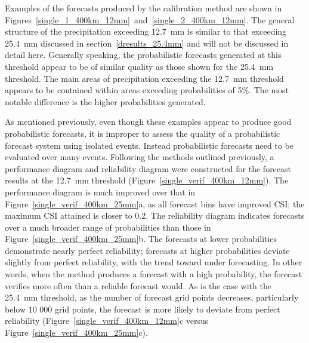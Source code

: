 Examples of the forecasts produced by the calibration method are shown in \mbox{Figures \ref{single_1_400km_12mm} and \ref{single_2_400km_12mm}}.
The general structure of the precipitation exceeding \mbox{12.7 mm} is similar to that exceeding \mbox{25.4 mm} discussed in \mbox{section \ref{dresults_25.4mm}} and will not be discussed in detail here.
Generally speaking, the probabilistic forecasts generated at this threshold appear to be of similar quality as those shown for the \mbox{25.4 mm} threshold.
The main areas of precipitation exceeding the \mbox{12.7 mm} threshold appears to be contained within areas exceeding probabilities of \mbox{5\%}.
The most notable difference is the higher probabilities generated.


As mentioned previously, even though these examples appear to produce good probabilistic forecasts, it is improper to assess the quality of a probabilistic forecast system using isolated events.
Instead probabilistic forecasts need to be evaluated over many events.
Following the methods outlined previously, a performance diagram and reliability diagram were constructed for the forecast results at the \mbox{12.7 mm} threshold \mbox{(Figure \ref{single_verif_400km_12mm})}.
The performance diagram is much improved over that in \mbox{Figure \ref{single_verif_400km_25mm}a}, as all forecast bins have improved CSI; the maximum CSI attained is closer to 0.2.
The reliability diagram indicates forecasts over a much broader range of probabilities than those in \mbox{Figure \ref{single_verif_400km_25mm}b}.
The forecasts at lower probabilities demonstrate nearly perfect reliability; forecasts at higher probabilities deviate slightly from perfect reliability, with the trend toward under forecasting.
In other words, when the method produces a forecast with a high probability, the forecast verifies more often than a reliable forecast would.
As is the case with the \mbox{25.4 mm} threshold, as the number of forecast grid points decreases, particularly below 10 000 grid points, the forecast is more likely to deviate from perfect reliability (\mbox{Figure \ref{single_verif_400km_12mm}c} versus \mbox{Figure \ref{single_verif_400km_25mm}c}).




